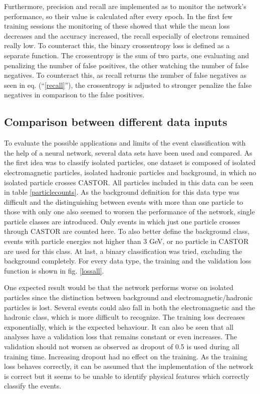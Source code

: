 Furthermore, precision and recall are implemented as to monitor the network's performance, so their value is calculated after every epoch. In the first few training sessions the monitoring of these showed that while the mean loss decreases and the accuracy increased, the recall especially of electrons remained really low. To counteract this, the binary crossentropy loss is defined as a separate function. The crossentropy is the sum of two parts, one evaluating and penalizing the number of false positives, the other watching the number of false negatives. To counteract this, as recall returns the number of false negatives as seen in eq. (\enquote{\ref{recall}}), the crossentropy is adjusted to stronger penalize the false negatives in comparison to the false positives.

\subsection{Comparison between different data inputs}

To evaluate the possible applications and limits of the event classification with the help of a neural network, several data sets have been used and compared. As the first idea was to classify isolated particles, one dataset is composed of isolated electromagnetic particles, isolated hadronic particles and background, in which no isolated particle crosses CASTOR. All particles included in this data can be seen in table \ref{particlecounts}. As the background definition for this data type was difficult and the distinguishing between events with more than one particle to those with only one also seemed to worsen the performance of the network, single particle classes are introduced. Only events in which just one particle crosses through CASTOR are counted here. To also better define the background class, events with particle energies not higher than 3 GeV, or no particle in CASTOR	are used for this class. At last, a binary classification was tried, excluding the background completely. For every data type, the training and the validation loss function is shown in fig. \ref{lossall}. 

One expected result would be that the network performs worse on isolated particles since the distinction between background and electromagnetic/hadronic particles is lost. Several events could also fall in both the electromagnetic and the hadronic class, which is more difficult to recognize. The training loss decreases exponentially, which is the expected behaviour. It can also be seen that all analyses have a validation loss that remains constant or even increases. The validation should not worsen as observed as dropout of 0.5 is used during all training time. Increasing dropout had no effect on the training. As the training loss behaves correctly, it can be assumed that the implementation of the network is correct but it seems to be unable to identify physical features which correctly classify the events.

